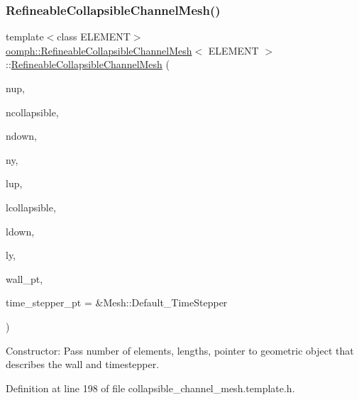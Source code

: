 \subsubsection{\texorpdfstring{Refineable\+Collapsible\+Channel\+Mesh()}{RefineableCollapsibleChannelMesh()}}
{\footnotesize\ttfamily template$<$class E\+L\+E\+M\+E\+NT$>$ \\
\hyperlink{classoomph_1_1RefineableCollapsibleChannelMesh}{oomph\+::\+Refineable\+Collapsible\+Channel\+Mesh}$<$ E\+L\+E\+M\+E\+NT $>$\+::\hyperlink{classoomph_1_1RefineableCollapsibleChannelMesh}{Refineable\+Collapsible\+Channel\+Mesh} (\begin{DoxyParamCaption}\item[{const unsigned \&}]{nup,  }\item[{const unsigned \&}]{ncollapsible,  }\item[{const unsigned \&}]{ndown,  }\item[{const unsigned \&}]{ny,  }\item[{const double \&}]{lup,  }\item[{const double \&}]{lcollapsible,  }\item[{const double \&}]{ldown,  }\item[{const double \&}]{ly,  }\item[{Geom\+Object $\ast$}]{wall\+\_\+pt,  }\item[{Time\+Stepper $\ast$}]{time\+\_\+stepper\+\_\+pt = {\ttfamily \&Mesh\+:\+:Default\+\_\+TimeStepper} }\end{DoxyParamCaption})\hspace{0.3cm}{\ttfamily [inline]}}



Constructor\+: Pass number of elements, lengths, pointer to geometric object that describes the wall and timestepper. 



Definition at line 198 of file collapsible\+\_\+channel\+\_\+mesh.\+template.\+h.

\mbox{\label{classoomph_1_1RefineableCollapsibleChannelMesh_ae429201cc0fe53f5abf96b7d9564df65}} 
